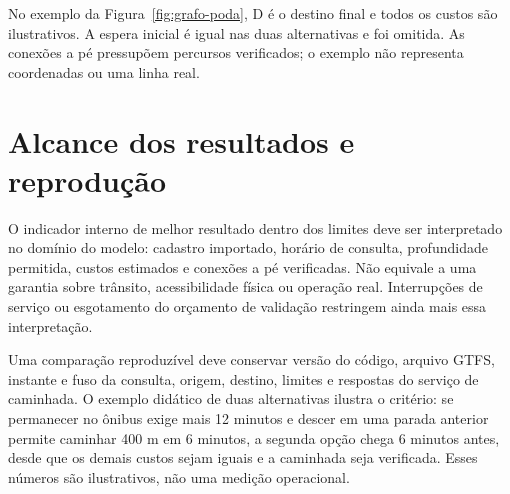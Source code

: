 \documentclass[12pt,oneside,a4paper,brazil,chapter=TITLE]{abntex2}
\let\papsection\section
\renewcommand{\section}{\clearpage\papsection}
\begin{document}
\begin{apendicesenv}
No exemplo da Figura~\ref{fig:grafo-poda}, D é o destino final e todos os custos são ilustrativos. A espera inicial é igual nas duas alternativas e foi omitida. As conexões a pé pressupõem percursos verificados; o exemplo não representa coordenadas ou uma linha real.

\section{Alcance dos resultados e reprodução}
O indicador interno de melhor resultado dentro dos limites deve ser interpretado no domínio do modelo: cadastro importado, horário de consulta, profundidade permitida, custos estimados e conexões a pé verificadas. Não equivale a uma garantia sobre trânsito, acessibilidade física ou operação real. Interrupções de serviço ou esgotamento do orçamento de validação restringem ainda mais essa interpretação.

Uma comparação reproduzível deve conservar versão do código, arquivo GTFS, instante e fuso da consulta, origem, destino, limites e respostas do serviço de caminhada. O exemplo didático de duas alternativas ilustra o critério: se permanecer no ônibus exige mais 12 minutos e descer em uma parada anterior permite caminhar 400 m em 6 minutos, a segunda opção chega 6 minutos antes, desde que os demais custos sejam iguais e a caminhada seja verificada. Esses números são ilustrativos, não uma medição operacional.


\end{apendicesenv}
\end{document}
